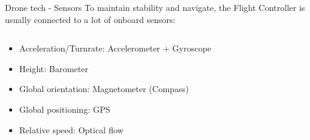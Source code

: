\documentclass[aspectratio=169]{beamer}
\begin{document}
\begin{frame}{Drone tech - Sensors}
	To maintain stability and navigate, the Flight Controller is usually connected to a lot of onboard sensors:
	\begin{columns}
	\begin{column}{.8\textwidth}
	\begin{itemize}
		\item Acceleration/Turnrate: Accelerometer + Gyroscope
		
		\item Height: Barometer
		
		\item Global orientation: Magnetometer (Compass)
		
		\item Global positioning: GPS
		
		\item Relative speed: Optical flow

	\end{itemize}
	\end{column}
	

\end{columns}
\end{frame}
\end{document}
